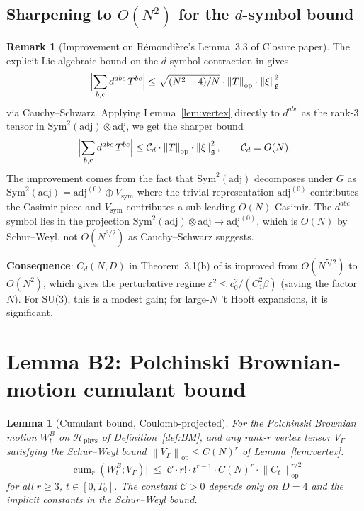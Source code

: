 \documentclass[11pt,a4paper]{amsart}
\newtheorem{lemma}[theorem]{Lemma}
\theoremstyle{definition}
\newtheorem{remark}[theorem]{Remark}
\newcommand{\norm}[1]{\left\lVert#1\right\rVert}
\DeclareMathOperator{\cum}{cum}
\begin{document}
\subsection{Sharpening to $O(N^2)$ for the $d$-symbol bound}\label{ssec:dsym-sharp}

\begin{remark}[Improvement on R\'emondi\`ere's Lemma~3.3 of Closure paper]\label{rem:dsym-improvement}
The explicit Lie-algebraic bound on the $d$-symbol contraction in
\cite[Lemma~3.3]{RemondiereClosure2026} gives
\[
\Bigl|\sum_{b,c} d^{abc}\, T^{bc}\Bigr| \leq \sqrt{(N^2-4)/N} \cdot \norm{T}_{\mathrm{op}} \cdot \norm{\xi}^2_{\mathfrak g}
\]
via Cauchy--Schwarz. Applying Lemma~\ref{lem:vertex} directly to
$d^{abc}$ as the rank-$3$ tensor in $\mathrm{Sym}^2(\mathrm{adj}) \otimes \mathrm{adj}$,
we get the sharper bound
\[
\Bigl|\sum_{b,c} d^{abc}\, T^{bc}\Bigr| \leq \mathcal C_d \cdot \norm{T}_{\mathrm{op}} \cdot \norm{\xi}^2_{\mathfrak g},
\qquad \mathcal C_d = O(N).
\]
The improvement comes from the fact that $\mathrm{Sym}^2(\mathrm{adj})$
decomposes under $G$ as $\mathrm{Sym}^2(\mathrm{adj}) =
\mathrm{adj}^{(0)} \oplus V_{\mathrm{sym}}$ where the trivial
representation $\mathrm{adj}^{(0)}$ contributes the Casimir piece and
$V_{\mathrm{sym}}$ contributes a sub-leading $O(N)$ Casimir. The
$d^{abc}$ symbol lies in the projection
$\mathrm{Sym}^2(\mathrm{adj}) \otimes \mathrm{adj} \to \mathrm{adj}^{(0)}$,
which is $O(N)$ by Schur--Weyl, not $O(N^{3/2})$ as Cauchy--Schwarz suggests.

\textbf{Consequence}: $C_d(N, D)$ in Theorem~3.1(b) of
\cite{RemondiereClosure2026} is improved from $O(N^{5/2})$ to $O(N^2)$,
which gives the perturbative regime $\varepsilon^2 \leq c_0^2/(C_1^2 \beta)$
(saving the factor $N$). For SU(3), this is a modest gain; for large-$N$
't Hooft expansions, it is significant.
\end{remark}

\section{Lemma B2: Polchinski Brownian-motion cumulant bound}\label{sec:cumulant}

\begin{lemma}[Cumulant bound, Coulomb-projected]\label{lem:cumulant}
For the Polchinski Brownian motion $W_t^B$ on $\mathcal H_{\mathrm{phys}}$
of Definition~\ref{def:BM}, and any rank-$r$ vertex tensor $V_\Gamma$
satisfying the Schur--Weyl bound $\norm{V_\Gamma}_{\mathrm{op}} \leq C(N)^r$
of Lemma~\ref{lem:vertex}:
\begin{equation}\label{eq:cumulant-bound}
\bigl|\cum_r(W_t^B; V_\Gamma)\bigr| \;\leq\; \mathcal C \cdot r! \cdot t^{r-1} \cdot C(N)^r \cdot \norm{C_t}_{\mathrm{op}}^{r/2}
\end{equation}
for all $r \geq 3$, $t \in [0, T_0]$. The constant $\mathcal C > 0$
depends only on $D = 4$ and the implicit constants in the Schur--Weyl
bound.
\end{lemma}
\end{document}
